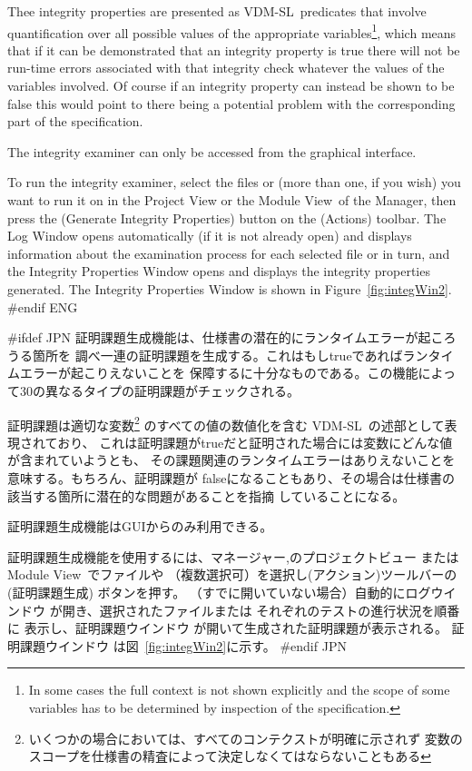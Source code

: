 \documentclass[\pformat,12pt]{article}
\newcommand{\vdmslpp}{VDM-SL}
\newcommand{\vdmModView}{\guicmd{Module View}}
\newcommand{\vdmModView}{\guicmd{モジュールビュー}}
\newcommand{\vdmslpp}{VDM++}
\newcommand{\vdmModView}{\guicmd{VDM View}}
\newcommand{\vdmModView}{\guicmd{VDMビュー}}
\newcommand{\guicmd}[1]{{\sf #1}}
\newcommand{\guicmd}[1]{{\gt #1}}
\begin{document}
Thee integrity properties are presented as \vdmslpp\ predicates that 
involve quantification over all possible values of the appropriate
variables\footnote{In some cases the full context is not shown
  explicitly and the scope of some variables has to be determined by
  inspection of the specification.}, which means that if it can be
demonstrated that an integrity property is true there will not be
run-time errors associated with that integrity check whatever the
values of the variables involved. Of course if an integrity property
can instead be shown to be false this would point to there being a
potential problem with the corresponding part of the specification.

The integrity examiner can only be accessed from the graphical
interface. 

To run the integrity examiner, select the files or
 (more than one, if you
wish) you want to run it on in the \guicmd{Project View} or the
\vdmModView\ of the \guicmd{Manager}, then press the
(\guicmd{Generate Integrity Properties}) button on the (\guicmd{Actions})
toolbar. The \guicmd{Log Window} opens automatically (if it is not
already open) and displays information about the examination process
for each selected file or 
in turn, and the \guicmd{Integrity Properties Window} opens and
displays the integrity properties generated. The \guicmd{Integrity
  Properties Window} is shown in Figure~\ref{fig:integWin2}.
#endif ENG

#ifdef JPN
証明課題生成機能は、仕様書の潜在的にランタイムエラーが起ころうる箇所を
調べ一連の証明課題を生成する。これはもしtrueであればランタイムエラーが起こりえないことを
保障するに十分なものである。この機能によって30の異なるタイプの証明課題がチェックされる。

証明課題は適切な変数\footnote{いくつかの場合においては、すべてのコンテクストが明確に示されず
  変数のスコープを仕様書の精査によって決定しなくてはならないこともある} のすべての値の数値化を含む
\vdmslpp\ の述部として表現されており、
これは証明課題がtrueだと証明された場合には変数にどんな値が含まれていようとも、
その課題関連のランタイムエラーはありえないことを意味する。もちろん、証明課題が
falseになることもあり、その場合は仕様書の該当する箇所に潜在的な問題があることを指摘
していることになる。

証明課題生成機能はGUIからのみ利用できる。

証明課題生成機能を使用するには、\guicmd{マネージャー},の\guicmd{プロジェクトビュー} または
\vdmModView\ でファイルや
 （複数選択可）を選択し(\guicmd{アクション})ツールバーの 
(\guicmd{証明課題生成}) ボタンを押す。 （すでに開いていない場合）自動的に\guicmd{ログウインドウ} 
が開き、選択されたファイルまたは
 それぞれのテストの進行状況を順番に
表示し、\guicmd{証明課題ウインドウ} が開いて生成された証明課題が表示される。
\guicmd{証明課題ウインドウ} は図~\ref{fig:integWin2}に示す。
#endif JPN
\end{document}
